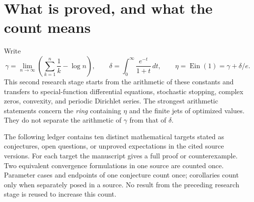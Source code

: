 \documentclass[11pt,a4paper]{article}
\theoremstyle{definition}
\theoremstyle{remark}
\DeclareMathOperator{\Ein}{Ein}
\numberwithin{equation}{section}
\begin{document}
\section{What is proved, and what the count means}
\label{p2:sec:round2-ledger}
Write
\[
 \gamma=\lim_{n\to\infty}\left(\sum_{k=1}^n\frac1k-\log n\right),
 \qquad \delta=\int_0^\infty\frac{e^{-t}}{1+t}\,dt,
 \qquad \eta=\Ein(1)=\gamma+\delta/e.
\]
This second research stage starts from the arithmetic of these constants
and transfers to special-function differential equations, stochastic
stopping, complex zeros, convexity, and periodic Dirichlet series.
The strongest arithmetic statements concern the \emph{ring} containing
$\eta$ and the finite jets of optimized values. They do not separate
the arithmetic of $\gamma$ from that of $\delta$.

The following ledger contains ten distinct mathematical targets stated
as conjectures, open questions, or unproved expectations in the cited
source versions. For each target the manuscript gives a full proof or
counterexample. Two equivalent convergence formulations in one source
are counted once. Parameter cases and endpoints of one conjecture count once; corollaries
count only when separately posed in a source.
No result from the preceding research stage is reused to increase this
count.
\end{document}
